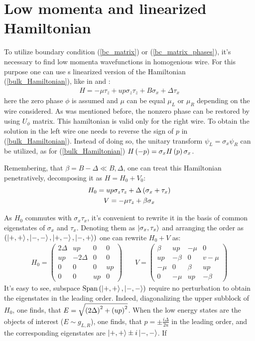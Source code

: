 \section{Low momenta and linearized Hamiltonian}

To utilize boundary condition (\ref{bc_matrix}) or (\ref{bc_matrix_phases}), it's necessary to find low momenta wavefunctions in homogenious wire. For this purpose one can use s linearized version of the Hamiltonian (\ref{bulk_Hamiltonian}), like in \cite{Oreg_2010} and \cite{Lutchyn_2010}:
\begin{gather}
\label{linearized_hamiltonian}
		H
	=
	-\mu \tau_z
	+
	u p \sigma_z \tau_z
	+
	B\sigma_x	
	+
	\Delta\tau_x
\end{gather}
here the zero phase $ \phi $ is assumed and $ \mu $ can be equal $ \mu_L $ or $ \mu_R $ depending on the wire considered. As was mentioned before, the nonzero phase can be restored by using $ U_\phi $ matrix. This hamiltonian is valid only for the right wire. To obtain the solution in the left wire one needs to reverse the sign of $ p $ in (\ref{bulk_Hamiltonian}). Instead of doing so, the unitary transform $ \psi_L=\sigma_x\psi_R $ can be utilized, as for (\ref{bulk_Hamiltonian}) $ H\left(-p\right)=\sigma_x H\left(p\right)\sigma_x $.

Remembering, that $ \beta=B-\Delta\ll B, \Delta $, one can	treat this Hamiltonian penetratively, decomposing it as $ H=H_0+V_0$:
\begin{gather}
	H_0=
	u p \sigma_z \tau_z
	+
	\Delta
	\left(\sigma_x	
	+
	\tau_x\right)
\\
V=-\mu \tau_z+\beta\sigma_x
\end{gather}

As $ H_0 $ commutes with $ \sigma_x\tau_x $, it's convenient to rewrite it in the basis of common eigenstates of $ \sigma_x $ and $ \tau_x $. Denoting them as $ \ket{\sigma_x, \tau_x }$ and arranging the order as $  \left(\ket{+, + },\ket{-, - },\ket{+, - },\ket{-, + }\right) $ one can rewrite $ H_0+V $ as:
\begin{gather}
	H_0
	=
	\begin{pmatrix}
	2\Delta & up & 0 & 0 \\
	up & -2\Delta & 0 & 0\\
	0 & 0 & 0 & up \\
	0 & 0 & up & 0 
	\end{pmatrix}
	~~~~~~~~
	V
	=
		\begin{pmatrix}
	\beta & up & -\mu & 0 \\
	up & -\beta & 0 & v-\mu\\
	-\mu & 0 & \beta & up \\
	0 & -\mu & up & -\beta 
	\end{pmatrix}
\end{gather}
It's easy to see, subspace $ \mathrm{Span}\left(\ket{+, + },\ket{-, - }\right) $ require no perturbation to obtain the eigenstates in the leading order. Indeed, diagonalizing the upper subblock of $ H_0 $, one finds, that $ E=\sqrt{\left(2\Delta\right)^2+\left(up\right)^2} $. When the low energy states are the objects of interest ($ E\sim g_{L,R} $), one finds, that $ p =\pm\frac{i\Delta}{2u} $ in the leading order, and the corresponding eigenstates are $\ket{+, + }\pm i\ket{-, - } $. If

